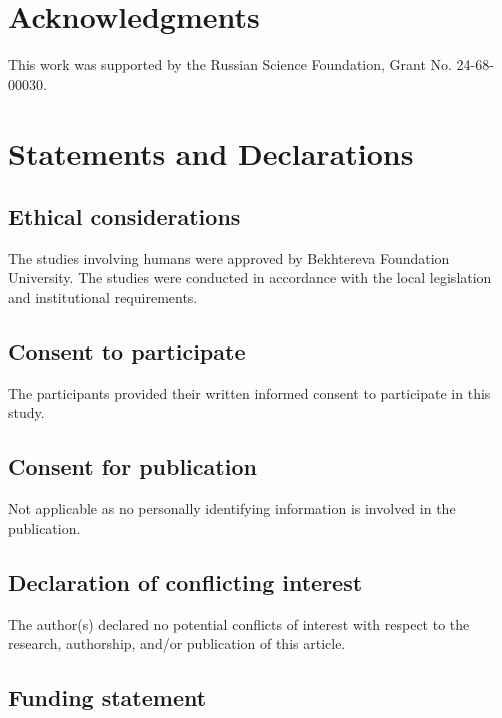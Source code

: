 \documentclass[shortAfour,times,sagev]{sagej}
\begin{document}
\maketitle

\section{Acknowledgments}

This work was supported by the Russian Science Foundation, Grant No. 24-68-00030.

\section{Statements and Declarations}

\subsection{Ethical considerations}

The studies involving humans were approved by Bekhtereva Foundation University.
The studies were conducted in accordance with the local legislation and institutional requirements.

\subsection{Consent to participate}

The participants provided their written informed consent to participate in this study.

\subsection{Consent for publication}

Not applicable as no personally identifying information is involved in the publication.

\subsection{Declaration of conflicting interest}

The author(s) declared no potential conflicts of interest with respect to the
research, authorship, and/or publication of this article.

\subsection{Funding statement}
\end{document}
